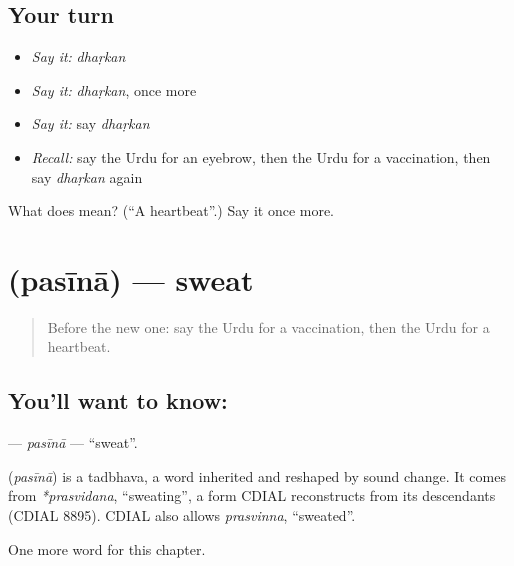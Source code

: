 \subsection*{Your turn}
\begin{itemize}
\raggedright
  \item \emph{Say it:} \emph{dhaṛkan}
  \item \emph{Say it:} \emph{dhaṛkan}, once more
  \item \emph{Say it:} say \emph{dhaṛkan}
  \item \emph{Recall:} say the Urdu for an eyebrow, then the Urdu for a vaccination, then say \emph{dhaṛkan} again
\end{itemize}

\begin{tcolorbox}[breakable,colback=teal!4,colframe=teal!35!black,title={Before you move on}]
What does  mean? (\textquotedblleft{}A heartbeat\textquotedblright{}.) Say it once more.
\end{tcolorbox}
\section[\texorpdfstring{\ur{پسینہ} (pasīnā)}{پسینہ (pasīnā)}]{ (pasīnā) — sweat}

\label{lesson:UR-C154-pasina}



\begin{quote}
Before the new one: say the Urdu for a vaccination, then the Urdu for a heartbeat.
\end{quote}

\subsection*{You'll want to know: }
\textbf{} — \emph{pasīnā} — \textquotedblleft{}sweat\textquotedblright{}.

\begin{cousinweb}
\textbf{} (\emph{pasīnā}) is a tadbhava, a word inherited and reshaped by sound change. It comes from \emph{*prasvidana}, \textquotedblleft{}sweating\textquotedblright{}, a form CDIAL reconstructs from its descendants (CDIAL 8895). CDIAL also allows \emph{prasvinna}, \textquotedblleft{}sweated\textquotedblright{}.
\end{cousinweb}

\begin{grammarlens}[title={What you've built}]
One more word for this chapter.
\end{grammarlens}

